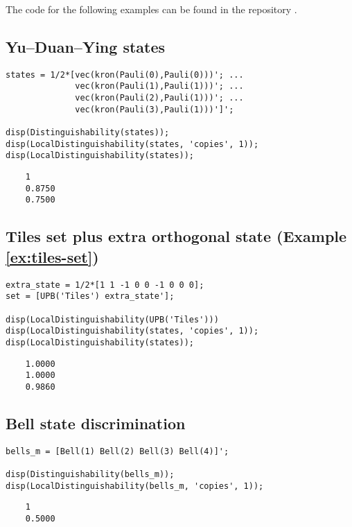 The code for the following examples can be found in the repository \cite{Cosentino15}. 

\subsection*{Yu--Duan--Ying states}

\begin{verbatim}
states = 1/2*[vec(kron(Pauli(0),Pauli(0)))'; ...
              vec(kron(Pauli(1),Pauli(1)))'; ...
              vec(kron(Pauli(2),Pauli(1)))'; ...
              vec(kron(Pauli(3),Pauli(1)))']';

disp(Distinguishability(states));
disp(LocalDistinguishability(states, 'copies', 1));
disp(LocalDistinguishability(states));
\end{verbatim}\color{lightgray} 
\begin{verbatim}     
    1
    0.8750
    0.7500
\end{verbatim} 

\color{black}

\subsection*{Tiles set plus extra orthogonal state (Example \ref{ex:tiles-set})}

\begin{verbatim}
extra_state = 1/2*[1 1 -1 0 0 -1 0 0 0];
set = [UPB('Tiles') extra_state'];

disp(LocalDistinguishability(UPB('Tiles')))
disp(LocalDistinguishability(states, 'copies', 1));
disp(LocalDistinguishability(states));
\end{verbatim}\color{lightgray} 
\begin{verbatim}    
    1.0000
    1.0000
    0.9860
\end{verbatim}

\color{black}

\subsection*{Bell state discrimination}

\begin{verbatim}
bells_m = [Bell(1) Bell(2) Bell(3) Bell(4)]';

disp(Distinguishability(bells_m));
disp(LocalDistinguishability(bells_m, 'copies', 1));
\end{verbatim}
\color{lightgray}
\begin{verbatim}     
    1
    0.5000
\end{verbatim} \color{black}
    
